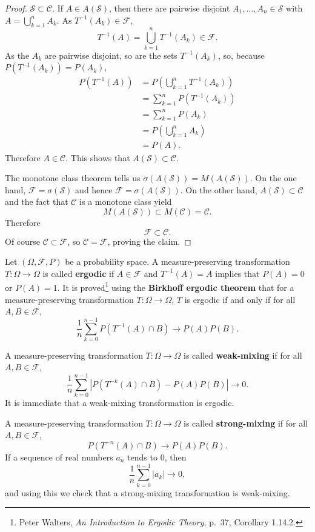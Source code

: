\documentclass{article}
\theoremstyle{definition}
\begin{document}
\begin{proof}
$\mathscr{S} \subset \mathscr{C}$. If $A \in A(\mathscr{S})$, then there are pairwise disjoint
$A_1,\ldots,A_n \in \mathscr{S}$ with $A = \bigcup_{k=1}^n A_k$. 
As $T^{-1}(A_k) \in \mathscr{F}$, 
\[
T^{-1}(A) = \bigcup_{k=1}^n T^{-1}(A_k) \in \mathscr{F}.
\]
As the $A_k$ are pairwise disjoint, so are the sets $T^{-1}(A_k)$, so, because $P(T^{-1}(A_k))=P(A_k)$,
\begin{align*}
P(T^{-1}(A)) &= P\left( \bigcup_{k=1}^n T^{-1}(A_k) \right)\\
&=\sum_{k=1}^n P(T^{-1}(A_k))\\
& = \sum_{k=1}^n P(A_k)\\
&=P\left(\bigcup_{k=1}^n A_k \right)\\
&=P(A).
\end{align*}
Therefore $A \in \mathscr{C}$. This shows that $A(\mathscr{S}) \subset \mathscr{C}$. 

The monotone class theorem tells us
$\sigma(A(\mathscr{S})) = M(A(\mathscr{S}))$.
 On the one hand, 
$\mathscr{F}=\sigma(\mathscr{S})$ and hence
$\mathscr{F}=\sigma(A(\mathscr{S}))$. 
On the other hand,
$A(\mathscr{S}) \subset \mathscr{C}$ and the fact that $\mathscr{C}$ is a monotone class  yield
\[
M(A(\mathscr{S})) \subset M(\mathscr{C})=\mathscr{C}.
\]
Therefore
\[
\mathscr{F} \subset \mathscr{C}.
\]
Of course $\mathscr{C} \subset \mathscr{F}$, so $\mathscr{C} = \mathscr{F}$, proving the claim.
\end{proof}


Let $(\Omega,\mathscr{F},P)$ be a probability space.  A measure-preserving transformation
$T:\Omega \to \Omega$ is called \textbf{ergodic} if $A \in \mathscr{F}$ and $T^{-1}(A)=A$ implies that
$P(A)=0$ or $P(A)=1$.
It is proved\footnote{Peter Walters,
{\em An Introduction to Ergodic Theory}, p.~37, Corollary 1.14.2.}
 using the \textbf{Birkhoff ergodic theorem} that for a measure-preserving transformation
$T:\Omega \to \Omega$, $T$ is ergodic if and only if for all $A,B \in \mathscr{F}$,
\[
\frac{1}{n} \sum_{k=0}^{n-1} P(T^{-1}(A) \cap B) \to P(A)P(B).
\]

A measure-preserving transformation $T:\Omega \to \Omega$ is called
\textbf{weak-mixing} if for all $A,B \in \mathscr{F}$,
\[
\frac{1}{n} \sum_{k=0}^{n-1} |P(T^{-k}(A) \cap B) - P(A) P(B)| \to 0.
\]
It is immediate that a weak-mixing transformation is ergodic.

A measure-preserving transformation $T:\Omega \to \Omega$ is called
\textbf{strong-mixing} if for all $A, B \in \mathscr{F}$,
\[
P(T^{-n}(A) \cap B) \to P(A) P(B).
\]
If a sequence of real numbers $a_n$ tends to $0$, then
\[
\frac{1}{n} \sum_{k=0}^{n-1} |a_k| \to 0,
\]
and using this we check that a strong-mixing transformation is weak-mixing.
\end{document}
